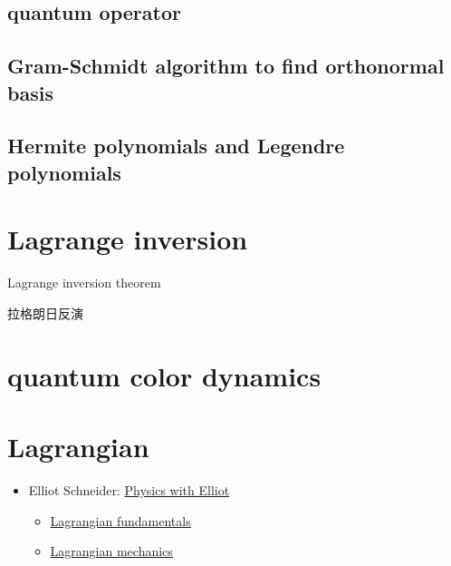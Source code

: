\documentclass[
]{book}
\providecommand{\tightlist}{%
  \setlength{\itemsep}{0pt}\setlength{\parskip}{0pt}}
\theoremstyle{definition}
\theoremstyle{definition}
\theoremstyle{definition}
\theoremstyle{definition}
\theoremstyle{remark}
\begin{document}
\hypertarget{quantum-operator}{%
\section{quantum operator}\label{quantum-operator}}

\hypertarget{gram-schmidt-algorithm-to-find-orthonormal-basis}{%
\section{Gram-Schmidt algorithm to find orthonormal basis}\label{gram-schmidt-algorithm-to-find-orthonormal-basis}}

\hypertarget{hermite-polynomials-and-legendre-polynomials}{%
\section{Hermite polynomials and Legendre polynomials}\label{hermite-polynomials-and-legendre-polynomials}}

\hypertarget{lagrange-inversion}{%
\chapter{Lagrange inversion}\label{lagrange-inversion}}

Lagrange inversion theorem

\begin{CJK}{UTF8}{bsmi}
拉格朗日反演
\end{CJK}

\hypertarget{quantum-color-dynamics}{%
\chapter{quantum color dynamics}\label{quantum-color-dynamics}}

\hypertarget{lagrangian}{%
\chapter{Lagrangian}\label{lagrangian}}

\begin{itemize}
\tightlist
\item
  Elliot Schneider: \href{https://www.youtube.com/@PhysicswithElliot/playlists}{Physics with Elliot}

  \begin{itemize}
  \tightlist
  \item
    \href{https://courses.physicswithelliot.com/products/fundamentals-of-lagrangian-mechanics}{Lagrangian fundamentals}
  \item
    \href{https://www.youtube.com/playlist?list=PL-IZN8QRUw-xRsoJPtXBlJyWlWrjVEF0x}{Lagrangian mechanics}
  \end{itemize}
\end{itemize}
\end{document}
